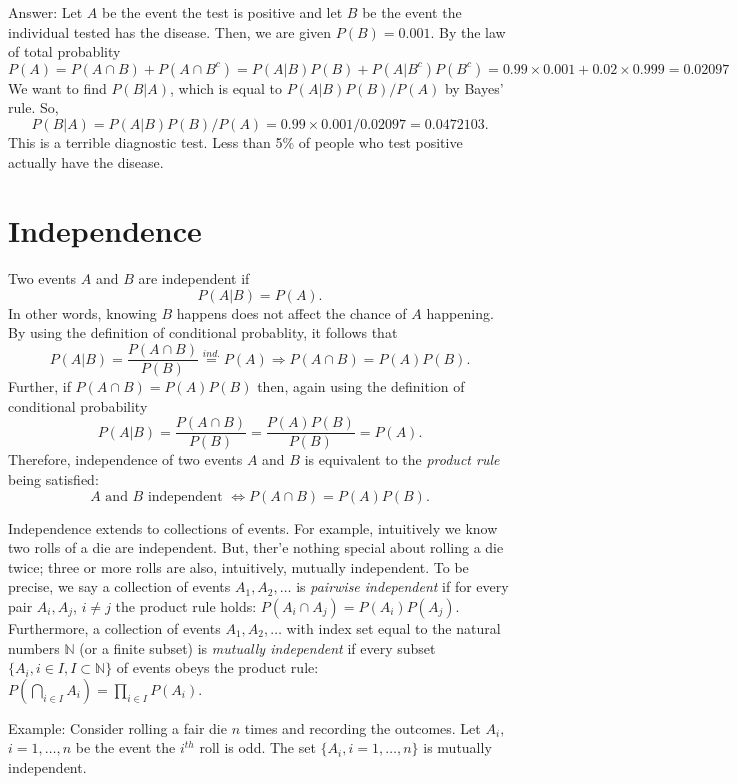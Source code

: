 \documentclass[
]{book}
\begin{document}
Answer:
Let \(A\) be the event the test is positive and let \(B\) be the event the individual tested has the disease. Then, we are given \(P(B) = 0.001\). By the law of total probablity
\[P(A) = P(A\cap B)+P(A\cap B^c) = P(A| B)P(B)+P(A| B^c)P(B^c) = 0.99\times 0.001 + 0.02\times 0.999 = 0.02097\]
We want to find \(P(B|A)\), which is equal to \(P(A|B)P(B)/P(A)\) by Bayes' rule. So,
\[P(B|A) = P(A|B)P(B)/P(A) = 0.99\times 0.001 / 0.02097 = 0.0472103.\]
This is a terrible diagnostic test. Less than 5\% of people who test positive actually have the disease.

\hypertarget{independence}{%
\section{Independence}\label{independence}}

Two events \(A\) and \(B\) are independent if
\[P(A|B) = P(A).\]
In other words, knowing \(B\) happens does not affect the chance of \(A\) happening. By using the definition of conditional probablity, it follows that
\[P(A|B) = \frac{P(A\cap B)}{P(B)} \stackrel{ind.}{=}P(A)\Rightarrow P(A\cap B) = P(A)P(B).\]
Further, if \(P(A\cap B) = P(A)P(B)\) then, again using the definition of conditional probability
\[P(A|B) = \frac{P(A\cap B)}{P(B)} = \frac{P(A)P(B)}{P(B)} = P(A).\]
Therefore, independence of two events \(A\) and \(B\) is equivalent to the \emph{product rule} being satisfied:
\[A\text{ and }B\text{ independent } \iff P(A\cap B) = P(A)P(B).\]

Independence extends to collections of events. For example, intuitively we know two rolls of a die are independent. But, ther'e nothing special about rolling a die twice; three or more rolls are also, intuitively, mutually independent. To be precise, we say a collection of events \(A_1, A_2, \ldots\) is \emph{pairwise independent} if for every pair \(A_i, A_j\), \(i\ne j\) the product rule holds: \(P(A_i \cap A_j) = P(A_i)P(A_j)\). Furthermore, a collection of events \(A_1, A_2, \ldots\) with index set equal to the natural numbers \(\mathbb{N}\) (or a finite subset) is \emph{mutually independent} if every subset \(\{A_i, i\in I, I\subset \mathbb{N}\}\) of events obeys the product rule: \(P( \bigcap_{i \in I} A_i) = \prod_{i \in I} P(A_i)\).

Example: Consider rolling a fair die \(n\) times and recording the outcomes. Let \(A_i,\) \(i = 1,\ldots,n\) be the event the \(i^{th}\) roll is odd. The set \(\{A_i, i=1, \ldots, n\}\) is mutually independent.
\end{document}
